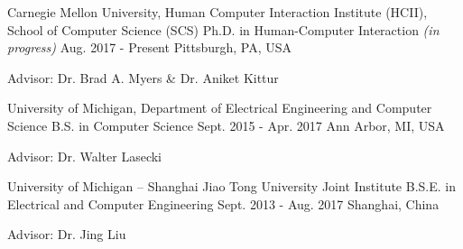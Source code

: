 

\begin{cventries}

  \cventry
    {Carnegie Mellon University, Human Computer Interaction Institute (HCII), School of Computer Science (SCS)} %
    {Ph.D. in Human-Computer Interaction \bodyfontlight\mdseries\textit{(in progress)}} %
    {Aug. 2017 - Present} %
    {Pittsburgh, PA, USA} %
    {
      \begin{cvitems} %
        \item {Advisor: Dr. Brad A. Myers \& Dr. Aniket Kittur}
      \end{cvitems}
    }
  
  \cventry
    {University of Michigan, Department of Electrical Engineering and Computer Science} %
    {B.S. in Computer Science} %
    {Sept. 2015 - Apr. 2017} %
    {Ann Arbor, MI, USA} %
    {
      \begin{cvitems} %
        \item {Advisor: Dr. Walter Lasecki}
      \end{cvitems}
    }
  
  \cventry
    {University of Michigan – Shanghai Jiao Tong University Joint Institute} %
    {B.S.E. in Electrical and Computer Engineering} %
    {Sept. 2013 - Aug. 2017} %
    {Shanghai, China} %
    {
      \begin{cvitems} %
        \item {Advisor: Dr. Jing Liu}
      \end{cvitems}
    }

\end{cventries}
